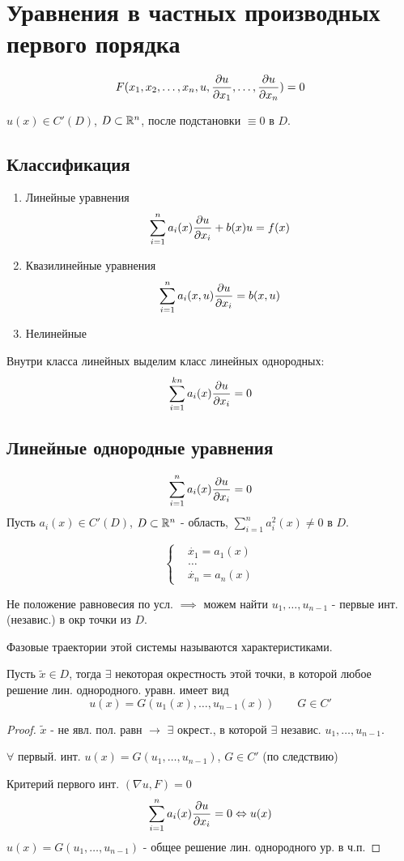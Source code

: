 \documentclass{article}
\begin{document}
\section{Уравнения в частных производных первого порядка}
\[
  F(x_1, x_2,\dots ,x_n, u, \frac{\partial{u}}{\partial{x_1}},\dots ,\frac{\partial{u}}{\partial{x_n}})=0
\]
\begin{definition}[Решение]
  $u(x) \in C'(D)$, $D \subset \mathbb{R}^{n}$, после подстановки $\equiv 0$ в $D$.
\end{definition}
\subsection{Классификация}
\begin{enumerate}
  \item Линейные уравнения
    \[
      \sum_{i=1}^{n}a_i(x)\frac{\partial{u}}{\partial{x_i}}+b(x)u=f(x)
    \]
  \item Квазилинейные уравнения
    \[
      \sum_{i=1}^{n}a_i(x,u)\frac{\partial{u}}{\partial{x_i}}=b(x,u)
    \]
  \item Нелинейные
\end{enumerate}
\begin{remark}
  Внутри класса линейных выделим класс линейных однородных:
  \[
    \sum_{i=1}^{kn}a_i(x)\frac{\partial{u}}{\partial{x_i}}=0
  \]
\end{remark}

\subsection{Линейные однородные уравнения}
\[
  \sum_{i=1}^{n}a_i(x)\frac{\partial{u}}{\partial{x_i}}=0
\]
Пусть $a_i(x) \in C'(D)$, $D\subset \mathbb{R}^{n}$ - область,
$\sum_{i=1}^{n}a_i^{2}(x) \neq 0$ в $D$.
\begin{definition}
\[
  \left\{\begin{aligned}
    & \dot{x_1} = a_1(x) \\ 
    & \dots  \\ 
    & \dot{x_n} = a_n(x)
  \end{aligned}\right. 
\]
\end{definition}
Не положение равновесия по усл. $\implies$ можем найти
$u_1, \dots , u_{n-1}$ - первые инт. (независ.) в окр точки из $D$.
\begin{definition}
  Фазовые траектории этой системы называются характеристиками.
\end{definition}
\begin{theorem}
  Пусть $\tilde{x}\in D$, тогда $\exists$ некоторая окрестность этой точки,
  в которой любое решение лин. однородного. уравн. имеет вид
  \[
    u(x)=G(u_1(x),\dots ,u_{n-1}(x)) \qquad G \in C'
  \]
\end{theorem}
\begin{proof}
  $\tilde{x}$ - не явл. пол. равн $\rightarrow$ $\exists$ окрест.,
  в которой $\exists$ независ. $u_1,\dots ,u_{n-1}$.

  $\forall$ первый. инт. $u(x)=G(u_1, \dots , u_{n-1})$, $G\in C'$ (по следствию)

  Критерий первого инт. $(\nabla u, F)=0$
  \[
    \sum_{i=1}^{n}a_i(x)\frac{\partial{u}}{\partial{x_i}}=0 \Leftrightarrow u(x)
  \]
  $u(x)=G(u_1,\dots ,u_{n-1})$ - общее решение лин. однородного ур. в ч.п.
\end{proof}
\end{document}
